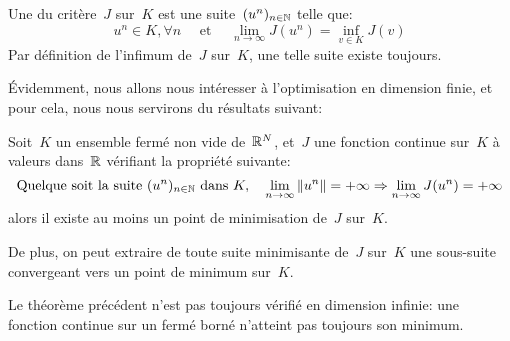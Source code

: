 \begin{definition}
Une  du critère~$J$ sur~$K$ est une suite~$(u^n)_{n\in\mathbb N}$ telle que:
\begin{equation}
u^n\in K, \forall n \quad\text{ et }\quad \lim_{n\rightarrow\infty} J(u^n)=\inf_{v\in K} J(v)
\end{equation}
Par définition de l'infimum de~$J$ sur~$K$, une telle suite existe toujours.
\end{definition}
Évidemment, nous allons nous intéresser à l'optimisation en dimension finie, et pour cela, nous nous servirons du résultats suivant:
\begin{theoreme}[Optimisation en dimension finie~$V=\RR^N$]
Soit~$K$ un ensemble fermé non vide de~$\mathbb R^N$, et~$J$ une fonction continue sur~$K$ à valeurs dans~$\mathbb R$ vérifiant la propriété  suivante:
\begin{equation}\label{Eq-infinieinfini}\colorblue
\text{Quelque soit la suite } (u^n)_{n\in\NN} \text{ dans }K,
\quad \lim_{n\rightarrow\infty}\|u^n\|=+\infty \Rightarrow \lim_{n\rightarrow\infty}J(u^n)=+\infty
\end{equation}
alors il existe au moins un point de minimisation de~$J$ sur~$K$.

De plus, on peut extraire de toute suite minimisante de~$J$ sur~$K$ une sous-suite convergeant vers un point de minimum sur~$K$.
\end{theoreme}
\begin{remarque}
Le théorème précédent n'est pas toujours vérifié en dimension infinie: une fonction continue sur un fermé borné n'atteint pas toujours son minimum.
\end{remarque}

